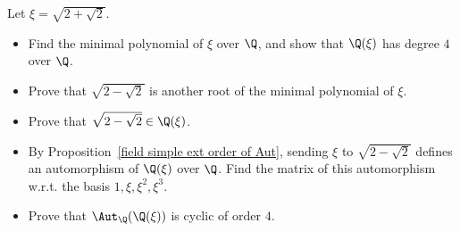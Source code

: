 \begin{exercise}\label{field ext eg sqrt(2+sqrt(2))}
Let $\xi=\sqrt{2+\sqrt{2}}$.
\begin{itemize}
\item Find the minimal polynomial of $\xi$ over $\Q$, and show that $\Q(\xi)$ has degree $4$ over
$\Q$.
\item Prove that $\sqrt{2-\sqrt{2}}$ is another root of the minimal polynomial of $\xi$.
\item Prove that $\sqrt{2-\sqrt{2}}\in\Q(\xi)$.
\item By Proposition~\ref{field simple ext order of Aut}, sending $\xi$ to $\sqrt{2-\sqrt{2}}$ defines an automorphism of $\Q(\xi)$ over $\Q$. Find the matrix of this automorphism w.r.t. the basis $1,\xi,\xi^2,\xi^3$.
\item Prove that $\Aut_\Q(\Q(\xi))$ is cyclic of order $4$.
\end{itemize}
\end{exercise}
